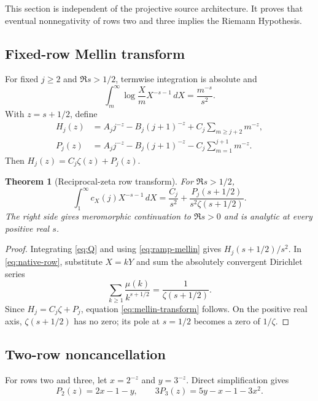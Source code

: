 \documentclass[11pt]{article}
\newtheorem{theorem}{Theorem}[section]
\newcommand{\1}{\mathbf 1}
\newcommand{\dd}{\,d}
\begin{document}
This section is independent of the projective source architecture.  It proves
that eventual nonnegativity of rows two and three implies the Riemann
Hypothesis.

\subsection{Fixed-row Mellin transform}

For fixed $j\ge2$ and $\Re s>1/2$, termwise integration is absolute and
\begin{equation}
 \int_m^\infty \log\frac Xm X^{-s-1}\dd X=\frac{m^{-s}}{s^2}.
 \label{eq:ramp-mellin}
\end{equation}
With $z=s+1/2$, define
\begin{align}
 H_j(z)&=A_jj^{-z}-B_j(j+1)^{-z}
 +C_j\sum_{m\ge j+2}m^{-z},\\
 P_j(z)&=A_jj^{-z}-B_j(j+1)^{-z}
 -C_j\sum_{m=1}^{j+1}m^{-z}.
 \label{eq:Pj}
\end{align}
Then $H_j(z)=C_j\zeta(z)+P_j(z)$.

\begin{theorem}[Reciprocal-zeta row transform]
For $\Re s>1/2$,
\begin{equation}
 \boxed{
 \int_1^\infty c_X(j)X^{-s-1}\dd X
 =\frac{C_j}{s^2}
 +\frac{P_j(s+1/2)}{s^2\zeta(s+1/2)}.}
 \label{eq:mellin-transform}
\end{equation}
The right side gives meromorphic continuation to $\Re s>0$ and is analytic at
every positive real $s$.
\end{theorem}

\begin{proof}
Integrating \eqref{eq:Q} and using \eqref{eq:ramp-mellin} gives
$H_j(s+1/2)/s^2$.  In \eqref{eq:native-row}, substitute $X=kY$ and sum the
absolutely convergent Dirichlet series
\[
 \sum_{k\ge1}\frac{\mu(k)}{k^{s+1/2}}
 =\frac1{\zeta(s+1/2)}.
\]
Since $H_j=C_j\zeta+P_j$, equation \eqref{eq:mellin-transform} follows.  On the
positive real axis, $\zeta(s+1/2)$ has no zero; its pole at $s=1/2$ becomes a
zero of $1/\zeta$.
\end{proof}

\subsection{Two-row noncancellation}

For rows two and three, let $x=2^{-z}$ and $y=3^{-z}$.  Direct simplification
gives
\begin{equation}
 P_2(z)=2x-1-y,
 \qquad
 3P_3(z)=5y-x-1-3x^2.
 \label{eq:P23}
\end{equation}
\end{document}
